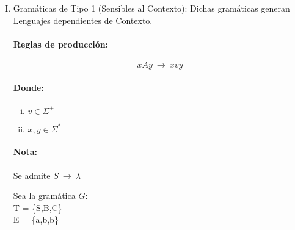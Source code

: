 \begin{enumerate}[I.]
{T = \{a,b\} \\
 
E = \{A,B,C\} \\

S = \{A\} \\

$ $P$\ = \begin{cases}

$A$\  {\longrightarrow}\ $aABC$\ |\ $abC$ \\
  
$CB$\ {\longrightarrow}\ $BC$ \\

$bB$\ {\longrightarrow}\ $bb$ \\

$bC$\ {\longrightarrow}\ $b$ \\
  
\end{cases}$
}
\item Gramáticas de Tipo 1 (Sensibles al Contexto): Dichas gramáticas generan Lenguajes dependientes de Contexto.
{
\paragraph*{Reglas de producción:}

\begin{equation}
xAy\ {\longrightarrow}\ xvy 
\end{equation}

\paragraph*{Donde:}

\begin{enumerate}[i.]

\item $v \in \Sigma^+$ 

\item $x,y \in \Sigma^*$

\end{enumerate}

\paragraph*{Nota:} Se admite $S\ {\longrightarrow}\ \lambda$

\ejem Sea la gramática $G$: \\

T = \{S,B,C\} \\
 
E = \{a,b,b\} \\

}
\end{enumerate}
